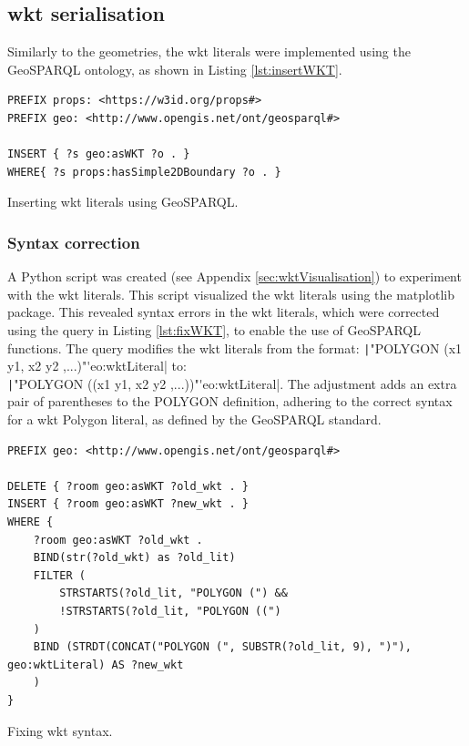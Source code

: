 \subsection{\acs{wkt} serialisation}

Similarly to the geometries, the \ac{wkt} literals were implemented using the GeoSPARQL ontology, as shown in Listing \ref{lst:insertWKT}.

\begin{listing}[H]
    \begin{verbatim}
PREFIX props: <https://w3id.org/props#>
PREFIX geo: <http://www.opengis.net/ont/geosparql#>

INSERT { ?s geo:asWKT ?o . }
WHERE{ ?s props:hasSimple2DBoundary ?o . }
    \end{verbatim}
    \caption[Inserting \acs{wkt} literals]{Inserting \acs{wkt} literals using GeoSPARQL.}
    \label{lst:insertWKT}
\end{listing}

\subsubsection{Syntax correction}

A Python script was created (see Appendix \ref{sec:wktVisualisation}) to experiment with the \ac{wkt} literals. This script visualized the \ac{wkt} literals using the matplotlib package. This revealed syntax errors in the \ac{wkt} literals, which were corrected using the query in Listing \ref{lst:fixWKT}, to enable the use of GeoSPARQL functions. The query modifies the \ac{wkt} literals from the format: \texttt|"POLYGON (x1 y1, x2 y2 ,...)"^^geo:wktLiteral| to:\\
\texttt|"POLYGON ((x1 y1, x2 y2 ,...))"^^geo:wktLiteral|. The adjustment adds an extra pair of parentheses to the POLYGON definition, adhering to the correct syntax for a \ac{wkt} Polygon literal, as defined by the GeoSPARQL standard.

\begin{listing}[H]
    \begin{verbatim}
PREFIX geo: <http://www.opengis.net/ont/geosparql#>

DELETE { ?room geo:asWKT ?old_wkt . }
INSERT { ?room geo:asWKT ?new_wkt . }
WHERE {
    ?room geo:asWKT ?old_wkt .
    BIND(str(?old_wkt) as ?old_lit)
    FILTER (
        STRSTARTS(?old_lit, "POLYGON (") &&
        !STRSTARTS(?old_lit, "POLYGON ((")
    )
    BIND (STRDT(CONCAT("POLYGON (", SUBSTR(?old_lit, 9), ")"), geo:wktLiteral) AS ?new_wkt
    )
}
    \end{verbatim}
    \caption{Fixing \acs{wkt} syntax.}
    \label{lst:fixWKT}
\end{listing}

